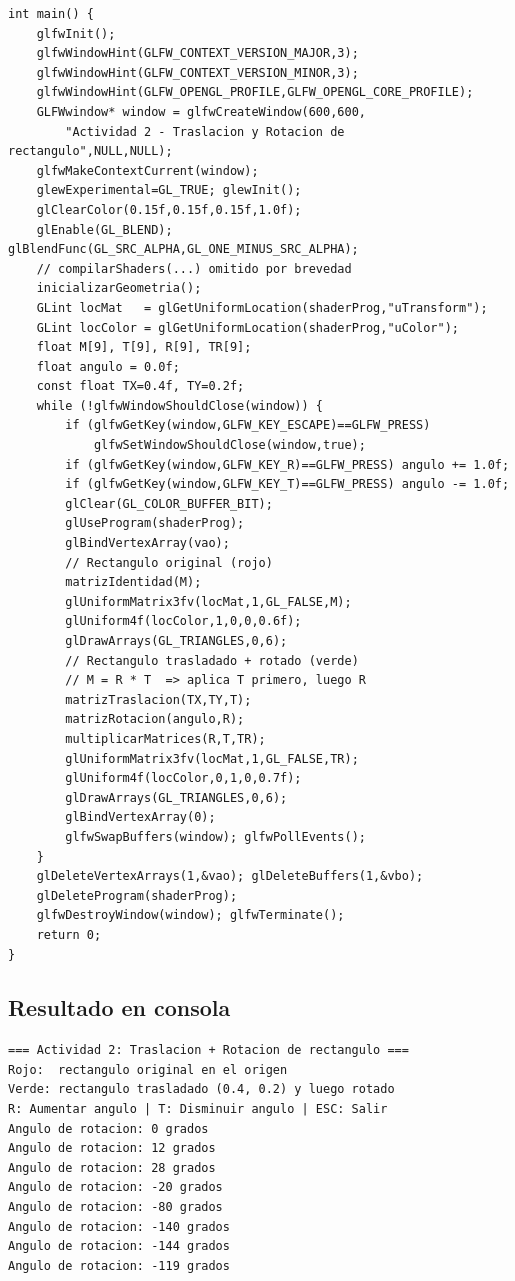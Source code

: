 \documentclass[12pt,a4paper]{article}
\begin{document}
\begin{lstlisting}[caption={actividadRectangulo.cpp}]
int main() {
    glfwInit();
    glfwWindowHint(GLFW_CONTEXT_VERSION_MAJOR,3);
    glfwWindowHint(GLFW_CONTEXT_VERSION_MINOR,3);
    glfwWindowHint(GLFW_OPENGL_PROFILE,GLFW_OPENGL_CORE_PROFILE);
    GLFWwindow* window = glfwCreateWindow(600,600,
        "Actividad 2 - Traslacion y Rotacion de rectangulo",NULL,NULL);
    glfwMakeContextCurrent(window);
    glewExperimental=GL_TRUE; glewInit();
    glClearColor(0.15f,0.15f,0.15f,1.0f);
    glEnable(GL_BLEND); glBlendFunc(GL_SRC_ALPHA,GL_ONE_MINUS_SRC_ALPHA);
    // compilarShaders(...) omitido por brevedad
    inicializarGeometria();
    GLint locMat   = glGetUniformLocation(shaderProg,"uTransform");
    GLint locColor = glGetUniformLocation(shaderProg,"uColor");
    float M[9], T[9], R[9], TR[9];
    float angulo = 0.0f;
    const float TX=0.4f, TY=0.2f;
    while (!glfwWindowShouldClose(window)) {
        if (glfwGetKey(window,GLFW_KEY_ESCAPE)==GLFW_PRESS)
            glfwSetWindowShouldClose(window,true);
        if (glfwGetKey(window,GLFW_KEY_R)==GLFW_PRESS) angulo += 1.0f;
        if (glfwGetKey(window,GLFW_KEY_T)==GLFW_PRESS) angulo -= 1.0f;
        glClear(GL_COLOR_BUFFER_BIT);
        glUseProgram(shaderProg);
        glBindVertexArray(vao);
        // Rectangulo original (rojo)
        matrizIdentidad(M);
        glUniformMatrix3fv(locMat,1,GL_FALSE,M);
        glUniform4f(locColor,1,0,0,0.6f);
        glDrawArrays(GL_TRIANGLES,0,6);
        // Rectangulo trasladado + rotado (verde)
        // M = R * T  => aplica T primero, luego R
        matrizTraslacion(TX,TY,T);
        matrizRotacion(angulo,R);
        multiplicarMatrices(R,T,TR);
        glUniformMatrix3fv(locMat,1,GL_FALSE,TR);
        glUniform4f(locColor,0,1,0,0.7f);
        glDrawArrays(GL_TRIANGLES,0,6);
        glBindVertexArray(0);
        glfwSwapBuffers(window); glfwPollEvents();
    }
    glDeleteVertexArrays(1,&vao); glDeleteBuffers(1,&vbo);
    glDeleteProgram(shaderProg);
    glfwDestroyWindow(window); glfwTerminate();
    return 0;
}
\end{lstlisting}

\subsection{Resultado en consola}

\begin{verbatim}
=== Actividad 2: Traslacion + Rotacion de rectangulo ===
Rojo:  rectangulo original en el origen
Verde: rectangulo trasladado (0.4, 0.2) y luego rotado
R: Aumentar angulo | T: Disminuir angulo | ESC: Salir
Angulo de rotacion: 0 grados
Angulo de rotacion: 12 grados
Angulo de rotacion: 28 grados
Angulo de rotacion: -20 grados
Angulo de rotacion: -80 grados
Angulo de rotacion: -140 grados
Angulo de rotacion: -144 grados
Angulo de rotacion: -119 grados
\end{verbatim}
\end{document}
